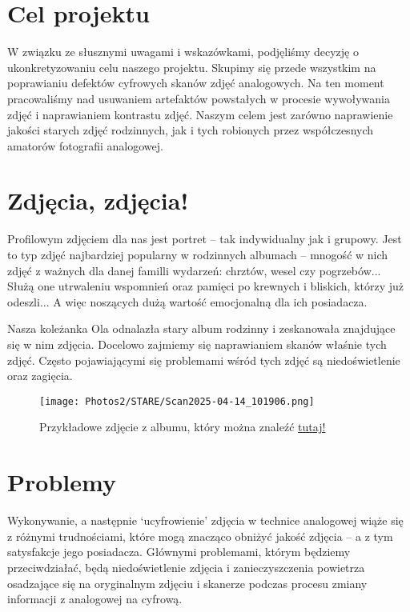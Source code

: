 \documentclass[]{mwart}
\begin{document}
\section{Cel projektu}
W związku ze słusznymi uwagami i wskazówkami, podjęliśmy decyzję o ukonkretyzowaniu celu naszego projektu.
Skupimy się przede wszystkim na poprawianiu defektów cyfrowych skanów zdjęć analogowych.
Na ten moment pracowaliśmy nad usuwaniem artefaktów powstałych w procesie wywoływania zdjęć i naprawianiem kontrastu zdjęć.
Naszym celem jest zarówno naprawienie jakości starych zdjęć rodzinnych,
jak i tych robionych przez współczesnych amatorów fotografii analogowej.

\section{Zdjęcia, zdjęcia!}
Profilowym zdjęciem dla nas jest portret -- tak indywidualny jak i grupowy.
Jest to typ zdjęć najbardziej popularny w rodzinnych albumach -- mnogość w nich zdjęć z ważnych
dla danej familli wydarzeń: chrztów, wesel czy pogrzebów... Służą one utrwaleniu wspomnień oraz pamięci
po krewnych i bliskich, którzy już odeszli... A więc noszących dużą wartość emocjonalną dla ich posiadacza.

Nasza koleżanka Ola odnalazła stary album rodzinny i zeskanowała znajdujące się w nim zdjęcia.
Docelowo zajmiemy się naprawianiem skanów właśnie tych zdjęć.
Często pojawiającymi się problemami wśród tych zdjęć są niedoświetlenie oraz zagięcia.

\begin{figure}[H]
    \centering
    \texttt{[image: Photos2/STARE/Scan2025-04-14\_101906.png]}
    \caption{Przykładowe zdjęcie z albumu, który można znaleźć \href{https://drive.google.com/drive/folders/1FME2DGxQ3jP6B-MKmGzHXzVHgdVP4-Fq}{tutaj!} }
\end{figure}

\newpage
\section{Problemy}
Wykonywanie, a następnie `ucyfrowienie' zdjęcia w technice analogowej wiąże się z różnymi trudnościami,
które mogą znacząco obniżyć jakość zdjęcia -- a z tym satysfakcje jego posiadacza. Głównymi problemami,
którym będziemy przeciwdziałać, będą niedoświetlenie zdjęcia i zanieczyszczenia powietrza osadzające
się na oryginalnym zdjęciu i skanerze podczas procesu zmiany informacji z analogowej na cyfrową.
\end{document}
